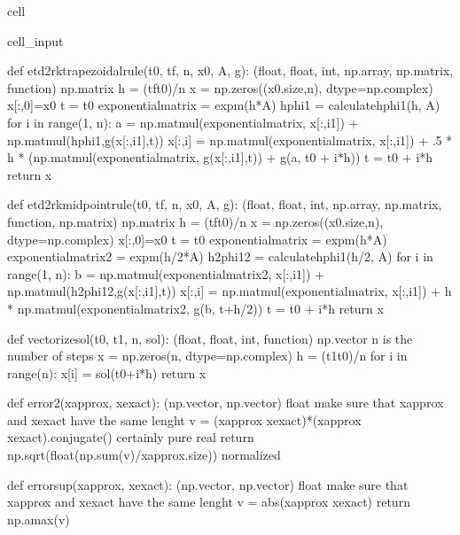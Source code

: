 \documentclass[letterpaper,10pt,english]{jupyterBook}
\begin{document}
\begin{sphinxuseclass}{cell}
\begin{sphinxVerbatimInput}
\begin{sphinxuseclass}{cell_input}
\begin{sphinxVerbatim}[commandchars=\\\{\}]
def etd2rk\PYGZus{}trapezoidal\PYGZus{}rule(t0, tf, n, x0, A, g):
    \PYGZsq{}\PYGZsq{}\PYGZsq{}(float, float, int, np.array, np.matrix, function) \PYGZhy{}\PYGZgt{} np.matrix\PYGZsq{}\PYGZsq{}\PYGZsq{}
    h = (tf\PYGZhy{}t0)/n
    x = np.zeros((x0.size,n), dtype=np.complex\PYGZus{})
    x[:,0]=x0
    t = t0
    exponential\PYGZus{}matrix = expm(\PYGZhy{}h*A)
    hphi1 = calculate\PYGZus{}hphi1(h, A)
    for i in range(1, n):
        a = np.matmul(exponential\PYGZus{}matrix, x[:,i\PYGZhy{}1]) + np.matmul(hphi1,g(x[:,i\PYGZhy{}1],t))
        x[:,i] = np.matmul(exponential\PYGZus{}matrix, x[:,i\PYGZhy{}1]) + .5 * h * (np.matmul(exponential\PYGZus{}matrix, g(x[:,i\PYGZhy{}1],t)) + g(a, t0 + i*h))
        t = t0 + i*h
    return x

def etd2rk\PYGZus{}midpoint\PYGZus{}rule(t0, tf, n, x0, A, g):
    \PYGZsq{}\PYGZsq{}\PYGZsq{}(float, float, int, np.array, np.matrix, function, np.matrix) \PYGZhy{}\PYGZgt{} np.matrix\PYGZsq{}\PYGZsq{}\PYGZsq{}
    h = (tf\PYGZhy{}t0)/n
    x = np.zeros((x0.size,n), dtype=np.complex\PYGZus{})
    x[:,0]=x0
    t = t0
    exponential\PYGZus{}matrix = expm(\PYGZhy{}h*A)
    exponential\PYGZus{}matrix\PYGZus{}2 = expm(\PYGZhy{}h/2*A)
    h\PYGZus{}2phi1\PYGZus{}2 = calculate\PYGZus{}hphi1(h/2, A)
    for i in range(1, n):
        b = np.matmul(exponential\PYGZus{}matrix\PYGZus{}2, x[:,i\PYGZhy{}1]) + np.matmul(h\PYGZus{}2phi1\PYGZus{}2,g(x[:,i\PYGZhy{}1],t))
        x[:,i] = np.matmul(exponential\PYGZus{}matrix, x[:,i\PYGZhy{}1]) + h * np.matmul(exponential\PYGZus{}matrix\PYGZus{}2, g(b, t+h/2))
        t = t0 + i*h
    return x

def vectorize\PYGZus{}sol(t0, t1, n, sol):
    \PYGZsq{}\PYGZsq{}\PYGZsq{}
    (float, float, int, function) \PYGZhy{}\PYGZgt{} np.vector
    n is the number of steps
    \PYGZsq{}\PYGZsq{}\PYGZsq{}
    x = np.zeros(n, dtype=np.complex\PYGZus{})
    h = (t1\PYGZhy{}t0)/n
    for i in range(n):
        x[i] = sol(t0+i*h)
    return x

def error\PYGZus{}2(x\PYGZus{}approx, x\PYGZus{}exact):
    \PYGZsq{}\PYGZsq{}\PYGZsq{} (np.vector, np.vector) \PYGZhy{}\PYGZgt{} float \PYGZsq{}\PYGZsq{}\PYGZsq{}
    \PYGZsh{}make sure that x\PYGZus{}approx and x\PYGZus{}exact have the same lenght
    v = (x\PYGZus{}approx \PYGZhy{} x\PYGZus{}exact)*(x\PYGZus{}approx \PYGZhy{} x\PYGZus{}exact).conjugate()
    \PYGZsh{}\PYGZca{}certainly pure real
    return np.sqrt(float(np.sum(v)/x\PYGZus{}approx.size)) \PYGZsh{}normalized

def error\PYGZus{}sup(x\PYGZus{}approx, x\PYGZus{}exact):
    \PYGZsq{}\PYGZsq{}\PYGZsq{} (np.vector, np.vector) \PYGZhy{}\PYGZgt{} float \PYGZsq{}\PYGZsq{}\PYGZsq{}
    \PYGZsh{}make sure that x\PYGZus{}approx and x\PYGZus{}exact have the same lenght
    v = abs(x\PYGZus{}approx \PYGZhy{} x\PYGZus{}exact)
    return np.amax(v)


\end{sphinxVerbatim}
\end{sphinxuseclass}
\end{sphinxVerbatimInput}
\end{sphinxuseclass}
\end{document}
